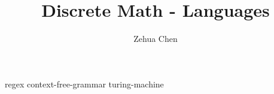 \documentclass[letterpaper, 12pt]{report}
\title{Discrete Math - Languages}
\author{Zehua Chen}
\begin{document}
  \maketitle
  \tableofcontents

  {regex}
  {context-free-grammar}
  {turing-machine}
\end{document}
